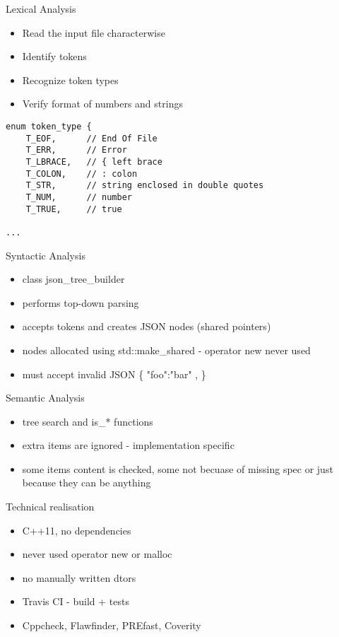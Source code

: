 \documentclass{beamer}
\begin{document}
\begin{frame}[fragile]{Lexical Analysis}

\begin{itemize}
    \item Read the input file characterwise
    \item Identify tokens
    \item Recognize token types
    \item Verify format of numbers and strings
\end{itemize}

\begin{Verbatim}[fontsize=\small]
enum token_type {
    T_EOF,      // End Of File
    T_ERR,      // Error
    T_LBRACE,   // { left brace
    T_COLON,    // : colon
    T_STR,      // string enclosed in double quotes
    T_NUM,      // number
    T_TRUE,     // true

...
\end{Verbatim}
\end{frame}

\begin{frame}{Syntactic Analysis}
\begin{itemize}
    \item class json\_tree\_builder
    \item performs top-down parsing
    \item accepts tokens and creates JSON nodes (shared pointers)
    \item nodes allocated using std::make\_shared - operator new never used
    \item must accept invalid JSON \{ "foo":"bar" , \}
\end{itemize}
\end{frame}

\begin{frame}{Semantic Analysis}
\begin{itemize}
	\item tree search and is\_* functions
	\item extra items are ignored - implementation specific
	\item some items content is checked, some not becuase of missing spec or just because they can be anything
\end{itemize}
\end{frame}

\begin{frame}{Technical realisation}
\begin{itemize}
    \item C++11, no dependencies
    \item never used operator new or malloc
    \item no manually written dtors
    \item Travis CI - build + tests
    \item Cppcheck, Flawfinder, PREfast, Coverity
\end{itemize}
\end{frame}
\end{document}
